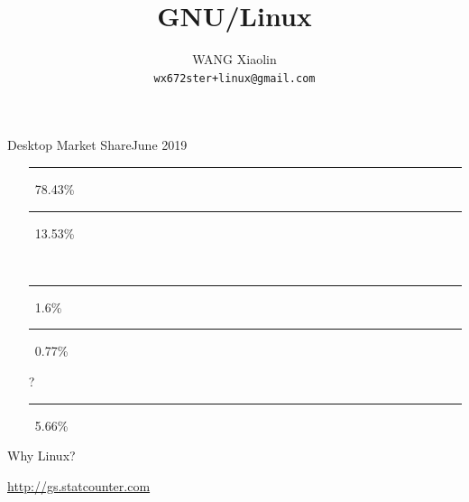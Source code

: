 \newcommand{\GG}{\textcolor{SkyBlue}{\nerd }}
\newcommand{\world}{\textcolor{blue}{\nerd }}
\newcommand{\iOS}{\textcolor{orange}{\nerd }}
\newcommand{\linux}{{\nerd }}
\newcommand{\openbook}{{\nerd }}

\title{GNU/Linux}

\author{WANG Xiaolin\\%
  {\footnotesize\texttt{wx672ster+linux@gmail.com}}}




\frame{\titlepage}

\begin{frame}{Desktop Market Share}{June 2019}
  \begin{itemize}
  \item[\win] \textcolor{SkyBlue}{\rule{.7843\textwidth}{2mm}}\,
    78.43\%    
  \item[\apple] \textcolor{LightGray}{\rule{.1353\textwidth}{2mm}}\,
    13.53\%
  \item[\linux] \rule{.016\textwidth}{2mm}\, 1.6\%
  \item[\chrome] \textcolor{Orange}{\rule{.0077\textwidth}{2mm}}\,
    0.77\%
  \item[?] \textcolor{Green}{\rule{.0566\textwidth}{2mm}}\, 5.66\%
  \end{itemize}

  \begin{center}
    \Huge\purisa Why Linux?
  \end{center}
  \vfill
  \begin{flushright}
    \scriptsize \url{http://gs.statcounter.com}
  \end{flushright}
\end{frame}

